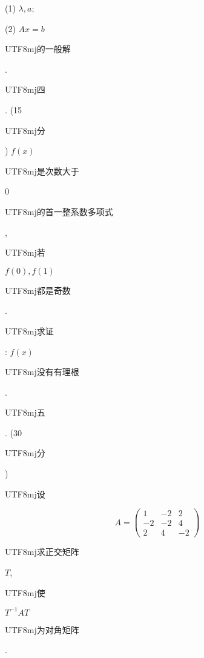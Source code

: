 \documentclass[10pt]{article}
\begin{document}
(1) $\lambda, a$;

(2) $A x=b$ \begin{CJK}{UTF8}{mj}的一般解\end{CJK}.

\begin{CJK}{UTF8}{mj}四\end{CJK}. (15 \begin{CJK}{UTF8}{mj}分\end{CJK}) $f(x)$ \begin{CJK}{UTF8}{mj}是次数大于\end{CJK} 0 \begin{CJK}{UTF8}{mj}的首一整系数多项式\end{CJK}, \begin{CJK}{UTF8}{mj}若\end{CJK} $f(0), f(1)$ \begin{CJK}{UTF8}{mj}都是奇数\end{CJK}. \begin{CJK}{UTF8}{mj}求证\end{CJK}: $f(x)$ \begin{CJK}{UTF8}{mj}没有有理根\end{CJK}.

\begin{CJK}{UTF8}{mj}五\end{CJK}. (30 \begin{CJK}{UTF8}{mj}分\end{CJK}) \begin{CJK}{UTF8}{mj}设\end{CJK}
$$
A=\left(\begin{array}{ccc}
1 & -2 & 2 \\
-2 & -2 & 4 \\
2 & 4 & -2
\end{array}\right)
$$
\begin{CJK}{UTF8}{mj}求正交矩阵\end{CJK} $T$, \begin{CJK}{UTF8}{mj}使\end{CJK} $T^{-1} A T$ \begin{CJK}{UTF8}{mj}为对角矩阵\end{CJK}.
\end{document}
